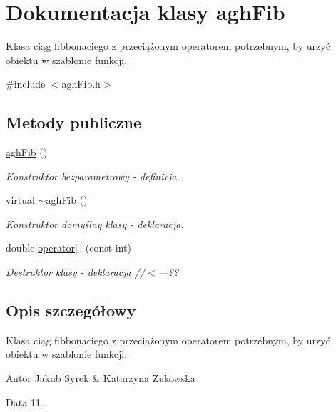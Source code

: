 \hypertarget{classaghFib}{\section{Dokumentacja klasy agh\-Fib}
\label{classaghFib}
}


Klasa ciąg fibbonaciego z przeciążonym operatorem potrzebnym, by urzyć obiektu w szablonie funkcji.  




{\ttfamily \#include $<$agh\-Fib.\-h$>$}

\subsection*{Metody publiczne}
\begin{DoxyCompactItemize}
\item 
\hypertarget{classaghFib_a29620a78632c6786822cc15f70aa6670}{\hyperlink{classaghFib_a29620a78632c6786822cc15f70aa6670}{agh\-Fib} ()}\label{classaghFib_a29620a78632c6786822cc15f70aa6670}

\begin{DoxyCompactList}\small\item\em Konstruktor bezparametrowy -\/ definicja. \end{DoxyCompactList}\item 
virtual \hyperlink{classaghFib_a7407b6fa45436f126eec8b876b16d223}{$\sim$agh\-Fib} ()
\begin{DoxyCompactList}\small\item\em Konstruktor domyślny klasy -\/ deklaracja. \end{DoxyCompactList}\item 
double \hyperlink{classaghFib_a7c6c1723b7a0fff4b1e0d896f98553e1}{operator\mbox{[}$\,$\mbox{]}} (const int)
\begin{DoxyCompactList}\small\item\em Destruktor klasy -\/ deklaracja //$<$---?? \end{DoxyCompactList}\end{DoxyCompactItemize}


\subsection{Opis szczegółowy}
Klasa ciąg fibbonaciego z przeciążonym operatorem potrzebnym, by urzyć obiektu w szablonie funkcji. 

\begin{DoxyAuthor}{Autor}
Jakub Syrek \& Katarzyna Żukowska 
\end{DoxyAuthor}
\begin{DoxyDate}{Data}
11.. 
\end{DoxyDate}


